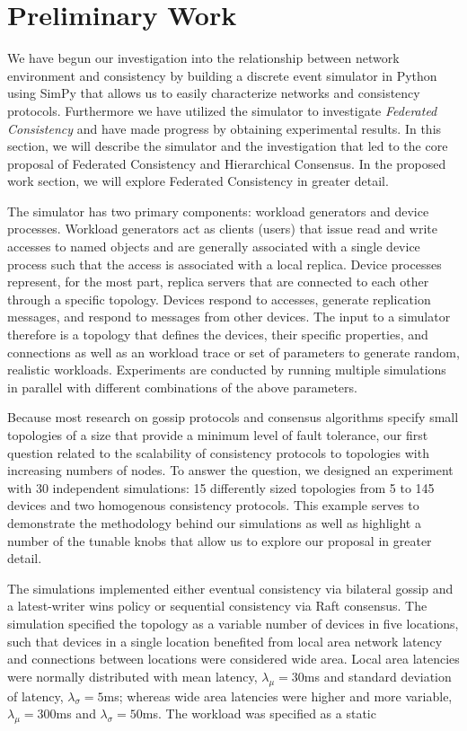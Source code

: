 \documentclass{article}
\begin{document}
\section{Preliminary Work}

We have begun our investigation into the relationship between network environment and consistency by building a discrete event simulator in Python using SimPy that allows us to easily characterize networks and consistency protocols. Furthermore we have utilized the simulator to investigate \textit{Federated Consistency} and have made progress by obtaining experimental results. In this section, we will describe the simulator and the investigation that led to the core proposal of Federated Consistency and Hierarchical Consensus. In the proposed work section, we will explore Federated Consistency in greater detail.

The simulator has two primary components: workload generators and device processes. Workload generators act as clients (users) that issue read and write accesses to named objects and are generally associated with a single device process such that the access is associated with a local replica. Device processes represent, for the most part, replica servers that are connected to each other through a specific topology. Devices respond to accesses, generate replication messages, and respond to messages from other devices. The input to a simulator therefore is a topology that defines the devices, their specific properties, and connections as well as an workload trace or set of parameters to generate random, realistic workloads. Experiments are conducted by running multiple simulations in parallel with different combinations of the above parameters.

Because most research on gossip protocols and consensus algorithms specify small topologies of a size that provide a minimum level of fault tolerance, our first question related to the scalability of consistency protocols to topologies with increasing numbers of nodes. To answer the question, we designed an experiment with 30 independent simulations: 15 differently sized topologies from 5 to 145 devices and two homogenous consistency protocols. This example serves to demonstrate the methodology behind our simulations as well as highlight a number of the tunable knobs that allow us to explore our proposal in greater detail.

The simulations implemented either eventual consistency via bilateral gossip and a latest-writer wins policy or sequential consistency via Raft consensus. The simulation specified the topology as a variable number of devices in five locations, such that devices in a single location benefited from local area network latency and connections between locations were considered wide area.  Local area latencies were normally distributed with mean latency, $\lambda_{\mu}=30$ms and standard deviation of latency, $\lambda_{\sigma}=5$ms; whereas wide area latencies were higher and more variable, $\lambda_{\mu}=300$ms and $\lambda_{\sigma}=50$ms. The workload was specified as a static
\end{document}
